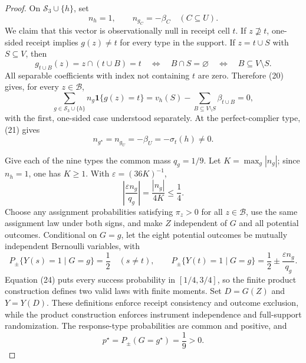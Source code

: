 \documentclass{article}
\begin{document}
\begin{proof}
On \(\mathcal S_3\cup\{h\}\), set
\[
n_h=1,
\qquad
n_{g_C}=-\beta_C \quad(C\subseteq U).
\]
We claim that this vector is observationally null in receipt cell \(t\).  If \(z\not\supseteq t\), one-sided receipt implies \(g(z)\ne t\) for every type in the support.  If \(z=t\cup S\) with \(S\subseteq V\), then
\[
g_{t\cup B}(z)=z\cap(t\cup B)=t
\quad\Longleftrightarrow\quad
B\cap S=\varnothing
\quad\Longleftrightarrow\quad
B\subseteq V\setminus S.
\]
All separable coefficients with index not containing \(t\) are zero.  Therefore (20) gives, for every \(z\in\mathcal B\),
\[
\sum_{g\in\mathcal S_3\cup\{h\}}n_g\mathbf 1\{g(z)=t\}
=v_h(S)-\sum_{B\subseteq V\setminus S}\beta_{t\cup B}
=0, \tag{22}
\]
with the first, one-sided case understood separately.  At the perfect-complier type, (21) gives
\[
n_{g^\star}=n_{g_U}=-\beta_U=-\sigma_t(h)\ne0. \tag{23}
\]

Give each of the nine types the common mass \(q_g=1/9\).  Let \(K=\max_g|n_g|\); since \(n_h=1\), one has \(K\ge1\).  With \(\varepsilon=(36K)^{-1}\),
\[
\left|\frac{\varepsilon n_g}{q_g}\right|
=\frac{|n_g|}{4K}\le\frac14. \tag{24}
\]
Choose any assignment probabilities satisfying \(\pi_z>0\) for all \(z\in\mathcal B\), use the same assignment law under both signs, and make \(Z\) independent of \(G\) and all potential outcomes.  Conditional on \(G=g\), let the eight potential outcomes be mutually independent Bernoulli variables, with
\[
P_\pm\{Y(s)=1\mid G=g\}=\frac12 \quad(s\ne t),
\qquad
P_\pm\{Y(t)=1\mid G=g\}
=\frac12\pm\frac{\varepsilon n_g}{q_g}. \tag{25}
\]
Equation (24) puts every success probability in \([1/4,3/4]\), so the finite product construction defines two valid laws with finite moments.  Set \(D=G(Z)\) and \(Y=Y(D)\).  These definitions enforce receipt consistency and outcome exclusion, while the product construction enforces instrument independence and full-support randomization.  The response-type probabilities are common and positive, and
\[
p^\star=P_\pm(G=g^\star)=\frac19>0. \tag{26}
\]


\end{proof}
\end{document}
